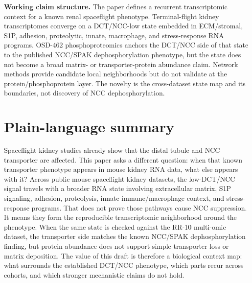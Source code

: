 \documentclass[11pt]{article}
\begin{document}
\vspace{0.8em}
\noindent\textbf{Working claim structure.}
The paper defines a recurrent transcriptomic context for a known renal spaceflight phenotype. Terminal-flight kidney transcriptomes converge on a DCT/NCC-low state embedded in ECM/stromal, S1P, adhesion, proteolytic, innate, macrophage, and stress-response RNA programs. OSD-462 phosphoproteomics anchors the DCT/NCC side of that state to the published NCC/SPAK dephosphorylation phenotype, but the state does not become a broad matrix- or transporter-protein abundance claim. Network methods provide candidate local neighborhoods but do not validate at the protein/phosphoprotein layer. The novelty is the cross-dataset state map and its boundaries, not discovery of NCC dephosphorylation.

\clearpage

\section*{Plain-language summary}

\noindent
Spaceflight kidney studies already show that the distal tubule and NCC transporter are affected. This paper asks a different question: when that known transporter phenotype appears in mouse kidney RNA data, what else appears with it? Across public mouse spaceflight kidney datasets, the low-DCT/NCC signal travels with a broader RNA state involving extracellular matrix, S1P signaling, adhesion, proteolysis, innate immune/macrophage context, and stress-response programs. That does not prove those pathways cause NCC suppression. It means they form the reproducible transcriptomic neighborhood around the phenotype. When the same state is checked against the RR-10 multi-omic dataset, the transporter side matches the known NCC/SPAK dephosphorylation finding, but protein abundance does not support simple transporter loss or matrix deposition. The value of this draft is therefore a biological context map: what surrounds the established DCT/NCC phenotype, which parts recur across cohorts, and which stronger mechanistic claims do not hold.

\vspace{0.8em}
\end{document}

